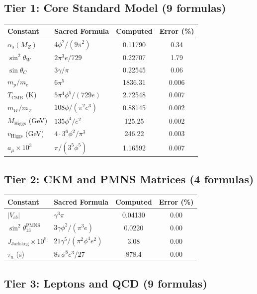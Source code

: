 \documentclass[12pt,a4paper]{article}
\begin{document}
\subsection{Tier 1: Core Standard Model (9 formulas)}

\begin{longtable}{llcc}
\toprule
\textbf{Constant} & \textbf{Sacred Formula} & \textbf{Computed} & \textbf{Error (\%)} \\
\midrule
\endhead
$\alpha_s(M_Z)$ & $4\phi^2/(9\pi^2)$ & 0.11790 & 0.34 \\
$\sin^2\theta_W$ & $2\pi^3e/729$ & 0.22707 & 1.79 \\
$\sin\theta_C$ & $3\gamma/\pi$ & 0.22545 & 0.06 \\
$m_p/m_e$ & $6\pi^5$ & 1836.31 & 0.006 \\
$T_{\text{CMB}}$ (K) & $5\pi^4\phi^5/(729e)$ & 2.72548 & 0.007 \\
$m_W/m_Z$ & $108\phi/(\pi^2 e^3)$ & 0.88145 & 0.002 \\
$M_{\text{Higgs}}$ (GeV) & $135\phi^4/e^2$ & 125.25 & 0.002 \\
$v_{\text{Higgs}}$ (GeV) & $4\cdot3^6\phi^2/\pi^3$ & 246.22 & 0.003 \\
$a_\mu \times 10^3$ & $\pi/(3^5\phi^5)$ & 1.16592 & 0.007 \\
\bottomrule
\end{longtable}

\subsection{Tier 2: CKM and PMNS Matrices (4 formulas)}

\begin{longtable}{llcc}
\toprule
\textbf{Constant} & \textbf{Sacred Formula} & \textbf{Computed} & \textbf{Error (\%)} \\
\midrule
$|V_{cb}|$ & $\gamma^3 \pi$ & 0.04130 & 0.00 \\
$\sin^2\theta_{13}^{\text{PMNS}}$ & $3\gamma\phi^2/(\pi^3 e)$ & 0.0220 & 0.00 \\
$J_{\text{Jarlskog}} \times 10^5$ & $21\gamma^5/(\pi^2\phi^4 e^2)$ & 3.08 & 0.00 \\
$\tau_n$ (s) & $8\pi\phi^8 e^3/27$ & 878.4 & 0.00 \\
\bottomrule
\end{longtable}

\subsection{Tier 3: Leptons and QCD (9 formulas)}
\end{document}
